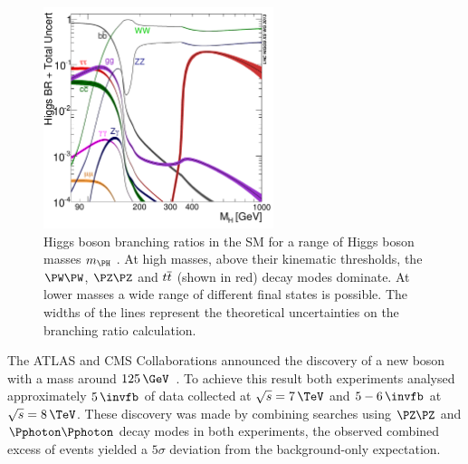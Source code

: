 \begin{figure}[!htb]
 \includegraphics[width=0.6\textwidth]{Chapter01/Images/Higgs_BR.pdf}
\caption[Higgs boson branching ratios in the SM for a range of Higgs boson
masses.]{Higgs boson branching ratios in the SM for a range of Higgs boson
masses $m_{\PH}$ \cite{ARTICLE:HandbookofLHCHiggsCrossSectionsHiggsProperties}. At high masses, above their
kinematic thresholds, the $\PW\PW$,
$\PZ\PZ$ and $t\overline{t}$ (shown in red) decay modes dominate. 
At lower masses a wide range of different final states is possible. 
The widths of the lines represent the
theoretical uncertainties on the branching ratio calculation.}
\label{FIGURE:Theory_SM_SearchingSMHiggs_SMHiggsBRs}
\end{figure}

The ATLAS and CMS Collaborations announced the discovery of a new boson with a mass around $125\,\GeV$~\cite{ARTICLE:CMS_HiggsDiscovery,ARTICLE:ATLAS_HiggsDiscovery}. To achieve this result both experiments analysed approximately $5\,\invfb$ of data collected at $\sqrt{s}=7\,\TeV$ and $5-6\,\invfb$ at $\sqrt{s}=8\,\TeV$. These discovery was made by combining searches using $\PZ\PZ$ and $\Pphoton\Pphoton$ decay modes in both experiments, the observed combined excess of events yielded a $5\sigma$ deviation from the background-only expectation.

